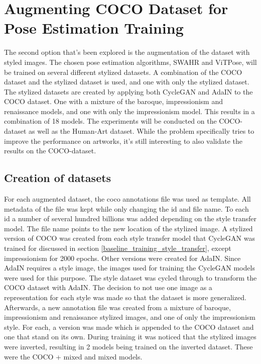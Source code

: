 \section{Augmenting COCO Dataset for Pose Estimation Training}
\label{chap:improvements_augmentation}
The second option that's been explored is the augmentation of the dataset with styled images.
The chosen pose estimation algorithms, SWAHR and ViTPose, will be trained on several different stylized datasets.
A combination of the COCO dataset and the stylized dataset is used, and one with only the stylized dataset.
The stylized datasets are created by applying both CycleGAN and AdaIN to the COCO dataset.
One with a mixture of the baroque, impressionism and renaissance models, and one with only the impressionism model.
This results in a combination of 18 models.
The experiments will be conducted on the COCO-dataset as well as the Human-Art dataset.
While the problem specifically tries to improve the performance on artworks, it's still interesting to also validate the results on the COCO-dataset.


\subsection{Creation of datasets}
\label{sec:improvements_dataset_pose_estimation}
For each augmented dataset, the coco annotations file was used as template.
All metadata of the file was kept while only changing the id and file name.
To each id a number of several hundred billions was added depending on the style transfer model.
The file name points to the new location of the stylized image.
A stylized version of COCO was created from each style transfer model that CycleGAN was trained for discussed in section \ref{baseline_training_style_transfer}, except impressionism for 2000 epochs.
Other versions were created for AdaIN.
Since AdaIN requires a style image, the images used for training the CycleGAN models were used for this purpose.
The style dataset was cycled through to transform the COCO dataset with AdaIN.
The decision to not use one image as a representation for each style was made so that the dataset is more generalized.
Afterwards, a new annotation file was created from a mixture of baroque, impressionism and renaissance stylized images, and one of only the impressionism style.
For each, a version was made which is appended to the COCO dataset and one that stand on its own.
During training it was noticed that the stylized images were inverted, resulting in 2 models being trained on the inverted dataset.
These were the COCO + mixed and mixed models.

